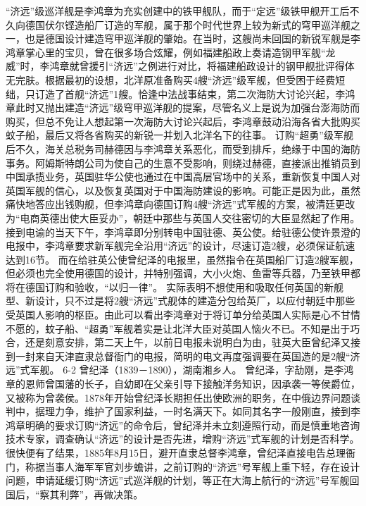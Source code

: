 \documentclass[12pt,UTF8]{ctexbook}
\begin{document}
“济远”级巡洋舰是李鸿章为充实创建中的铁甲舰队，而于“定远”级铁甲舰开工后不久向德国伏尔铿造船厂订造的军舰，属于那个时代世界上较为新式的穹甲巡洋舰之一，也是德国设计建造穹甲巡洋舰的肇始。在当时，这艘尚未回国的新锐军舰是李鸿章掌心里的宝贝，曾在很多场合炫耀，例如福建船政上奏请造钢甲军舰“龙威”时，李鸿章就曾援引“济远”之例进行对比，将福建船政设计的钢甲舰批评得体无完肤。根据最初的设想，北洋原准备购买4艘“济远”级军舰，但受困于经费短绌，只订造了首舰“济远”1艘。恰逢中法战事结束，第二次海防大讨论兴起，李鸿章此时又抛出建造“济远”级穹甲巡洋舰的提案，尽管名义上是说为加强台澎海防而购买，但总不免让人想起第一次海防大讨论兴起后，李鸿章鼓动沿海各省大批购买蚊子船，最后又将各省购买的新锐一并划入北洋名下的往事。
订购“超勇”级军舰后不久，海关总税务司赫德因与李鸿章关系恶化，而受到排斥，绝缘于中国的海防事务。阿姆斯特朗公司为使自己的生意不受影响，则绕过赫德，直接派出推销员到中国承揽业务，英国驻华公使也通过在中国高层官场中的关系，重新恢复中国人对英国军舰的信心，以及恢复英国对于中国海防建设的影响。可能正是因为此，虽然痛快地答应出钱购舰，但李鸿章向德国订购4艘“济远”式军舰的方案，被清廷更改为“电商英德出使大臣妥办”，朝廷中那些与英国人交往密切的大臣显然起了作用。
接到电谕的当天下午，李鸿章即分别转电中国驻德、英公使。给驻德公使许景澄的电报中，李鸿章要求新军舰完全沿用“济远”的设计，尽速订造2艘，必须保证航速达到16节。 而在给驻英公使曾纪泽的电报里，虽然指令在英国船厂订造2艘军舰，但必须也完全使用德国的设计，并特别强调，大小火炮、鱼雷等兵器，乃至铁甲都将在德国订购和验收，“以归一律”。 实际表明不想使用和吸取任何英国的新舰型、新设计，只不过是将2艘“济远”式舰体的建造分包给英厂，以应付朝廷中那些受英国人影响的枢臣。由此可以看出李鸿章对于将订单分给英国人实际是心不甘情不愿的，蚊子船、“超勇”军舰着实是让北洋大臣对英国人恼火不已。不知是出于巧合，还是刻意安排，第二天上午，以前日电报未说明白为由，驻英大臣曾纪泽又接到一封来自天津直隶总督衙门的电报，简明的电文再度强调要在英国造的是2艘“济远”式军舰。
6-2 曾纪泽（1839－1890），湖南湘乡人。
曾纪泽，字劼刚，是李鸿章的恩师曾国藩的长子，自幼即在父亲引导下接触洋务知识，因承袭一等侯爵位，又被称为曾袭侯。1878年开始曾纪泽长期担任出使欧洲的职务，在中俄边界问题谈判中，据理力争，维护了国家利益，一时名满天下。如同其名字一般刚直，接到李鸿章明确的要求订购“济远”的命令后，曾纪泽并未立刻遵照行动，而是慎重地咨询技术专家，调查确认“济远”的设计是否先进，增购“济远”式军舰的计划是否科学。很快便有了结果，1885年8月15日，避开直隶总督李鸿章，曾纪泽直接电告总理衙门，称据当事人海军军官刘步蟾讲，之前订购的“济远”号军舰上重下轻，存在设计问题，申请延缓订购“济远”式巡洋舰的计划，等正在大海上航行的“济远”号军舰回国后，“察其利弊”，再做决策。
\end{document}
